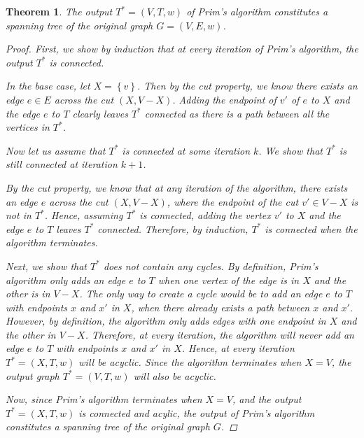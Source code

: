 \documentclass[a4paper,11pt]{report}
\theoremstyle{plain}
\newtheorem{thm}{Theorem}[section]
\theoremstyle{definition}
\begin{document}
\begin{thm}
The output $T^* = (V, T, w)$ of Prim's algorithm constitutes a spanning tree
of the original graph $G = (V, E, w)$.

\begin{proof}
First, we show by induction that at every iteration of Prim's algorithm, the
output $T^*$ is connected.

In the base case, let $X = \left\{v\right\}$. Then by the cut property, we
know there exists an edge $e \in E$ across the cut $(X, V - X)$. Adding the
endpoint of $v'$ of $e$ to $X$ and the edge $e$ to $T$ clearly leaves $T^*$
connected as there is a path between all the vertices in $T^*$.

Now let us assume that $T^*$ is connected at some iteration $k$. We show that
$T^*$ is still connected at iteration $k + 1$.

By the cut property, we know that at any iteration of the algorithm, there
exists an edge $e$ across the cut $(X, V - X)$, where the endpoint of the cut
$v' \in V - X$ is not in $T^*$. Hence, assuming $T^*$ is connected, adding the
vertex $v'$ to $X$ and the edge $e$ to $T$ leaves $T^*$ connected. Therefore,
by induction, $T^*$ is connected when the algorithm terminates.

Next, we show that $T^*$ does not contain any cycles. By definition, Prim's
algorithm only adds an edge $e$ to $T$ when one vertex of the edge is in $X$
and the other is in $V - X$. The only way to create a cycle would be to add
an edge $e$ to $T$ with endpoints $x$ and $x'$ in $X$, when there already
exists a path between $x$ and $x'$. However, by definition, the algorithm
only adds edges with one endpoint in $X$ and the other in $V - X$. Therefore,
at every iteration, the algorithm will never add an edge $e$ to $T$ with
endpoints $x$ and $x'$ in $X$. Hence, at every iteration $T^* = (X, T, w)$
will be acyclic. Since the algorithm terminates when $X = V$, the output
graph $T^* = (V, T, w)$ will also be acyclic.


Now, since Prim's algorithm terminates when $X = V$, and the output
$T^* = (X, T, w)$ is connected and acylic, the output of Prim's algorithm
constitutes a spanning tree of the original graph $G$.
\end{proof}
\end{thm}
\end{document}
